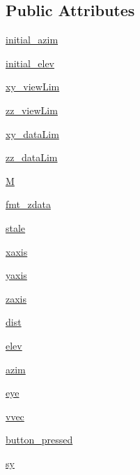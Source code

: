 \subsection*{Public Attributes}
\begin{DoxyCompactItemize}
\item 
\hyperlink{classmplot3d_1_1axes3d_1_1Axes3D_abc13351bd78cbc9f01b79b166468e2b7}{initial\+\_\+azim}
\item 
\hyperlink{classmplot3d_1_1axes3d_1_1Axes3D_aaf3290a2208c08b339fbc1f6c4649400}{initial\+\_\+elev}
\item 
\hyperlink{classmplot3d_1_1axes3d_1_1Axes3D_afdcb9e6f8544ac572b4a36dedccf468a}{xy\+\_\+view\+Lim}
\item 
\hyperlink{classmplot3d_1_1axes3d_1_1Axes3D_a9eb1ed62431c2efe0d00c71dbeb603b1}{zz\+\_\+view\+Lim}
\item 
\hyperlink{classmplot3d_1_1axes3d_1_1Axes3D_a42f722c46ed6c52dafed4278f545b55a}{xy\+\_\+data\+Lim}
\item 
\hyperlink{classmplot3d_1_1axes3d_1_1Axes3D_ad73a91eea4767933fcbb6c2bded31e13}{zz\+\_\+data\+Lim}
\item 
\hyperlink{classmplot3d_1_1axes3d_1_1Axes3D_ab9a6d6d85b56c3d3dfd4677b30293340}{M}
\item 
\hyperlink{classmplot3d_1_1axes3d_1_1Axes3D_a776be3fe3474d8c3dac57195b7f3bc05}{fmt\+\_\+zdata}
\item 
\hyperlink{classmplot3d_1_1axes3d_1_1Axes3D_af0eb2041753172a39b2620f9c6f2b625}{stale}
\item 
\hyperlink{classmplot3d_1_1axes3d_1_1Axes3D_a9a9fc356d45c4da4ce3678ac061561f9}{xaxis}
\item 
\hyperlink{classmplot3d_1_1axes3d_1_1Axes3D_a066ea36d40159875da81f1abb3dba74c}{yaxis}
\item 
\hyperlink{classmplot3d_1_1axes3d_1_1Axes3D_a21545464f5cdbf7180af19ef214c61db}{zaxis}
\item 
\hyperlink{classmplot3d_1_1axes3d_1_1Axes3D_a7ea36dfe1de7db9a08373e03a34f1a91}{dist}
\item 
\hyperlink{classmplot3d_1_1axes3d_1_1Axes3D_ac4c7a5f33145517f85154fcba5f4410f}{elev}
\item 
\hyperlink{classmplot3d_1_1axes3d_1_1Axes3D_af9329eb594554894e36578f08fc5bd1c}{azim}
\item 
\hyperlink{classmplot3d_1_1axes3d_1_1Axes3D_a96564825235f60d3e05b0b51394b9d9b}{eye}
\item 
\hyperlink{classmplot3d_1_1axes3d_1_1Axes3D_a4655d1848ae36f4c0d800ee4019f19ff}{vvec}
\item 
\hyperlink{classmplot3d_1_1axes3d_1_1Axes3D_a90102d907463d4394b64f89389efa4ea}{button\+\_\+pressed}
\item 
\hyperlink{classmplot3d_1_1axes3d_1_1Axes3D_ac1e3246ab40f8c3f4f98f3665be2a0ba}{sy}
\end{DoxyCompactItemize}
